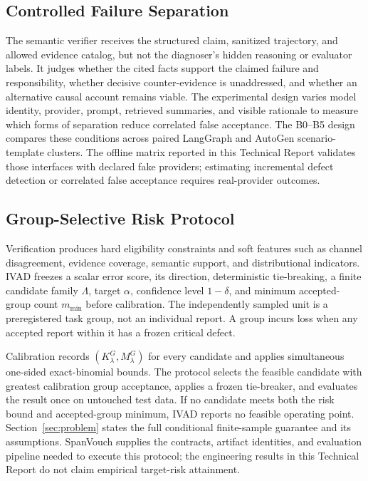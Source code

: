 \subsection{Controlled Failure Separation}

The semantic verifier receives the structured claim, sanitized trajectory, and
allowed evidence catalog, but not the diagnoser's hidden reasoning or evaluator
labels. It judges whether the cited facts support the claimed failure and
responsibility, whether decisive counter-evidence is unaddressed, and whether
an alternative causal account remains viable. The experimental design varies
model identity, provider, prompt, retrieved summaries, and visible rationale
to measure which forms of separation reduce correlated false acceptance.
The B0--B5 design compares these conditions across paired LangGraph and
AutoGen scenario-template clusters. The offline matrix reported in this Technical Report
validates those interfaces with declared fake providers; estimating incremental
defect detection or correlated false acceptance requires real-provider outcomes.

\subsection{Group-Selective Risk Protocol}

Verification produces hard eligibility constraints and soft features such as
channel disagreement, evidence coverage, semantic support, and distributional
indicators. IVAD freezes a scalar error score, its direction, deterministic
tie-breaking, a finite candidate family $\Lambda$, target $\alpha$, confidence
level $1-\delta$, and minimum accepted-group count $m_{\min}$ before
calibration. The independently sampled unit is a preregistered task group, not
an individual report. A group incurs loss when any accepted report within it
has a frozen critical defect.

Calibration records $(K_\lambda^G,M_\lambda^G)$ for every candidate and applies
simultaneous one-sided exact-binomial bounds. The protocol selects the feasible
candidate with greatest calibration group acceptance, applies a frozen
tie-breaker, and evaluates the result once on untouched test data. If no
candidate meets both the risk bound and accepted-group minimum, IVAD reports no
feasible operating point. Section~\ref{sec:problem} states the full conditional
finite-sample guarantee and its assumptions. SpanVouch supplies the contracts,
artifact identities, and evaluation pipeline needed to execute this protocol;
the engineering results in this Technical Report do not claim empirical target-risk
attainment.

